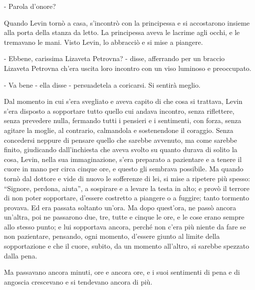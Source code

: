 - Parola d'onore? 

Quando Levin tornò a casa, s'incontrò con la principessa e si accostarono insieme alla porta della stanza da letto. La principessa aveva le lacrime agli occhi, e le tremavano le mani. Visto Levin, lo abbracciò e si mise a piangere. 

- Ebbene, carissima Lizaveta Petrovna? - disse, afferrando per un braccio Lizaveta Petrovna ch'era uscita loro incontro con un viso luminoso e preoccupato. 

- Va bene - ella disse - persuadetela a coricarsi. Si sentirà meglio. 

Dal momento in cui s'era svegliato e aveva capito di che cosa si trattava, Levin s'era disposto a sopportare tutto quello cui andava incontro, senza riflettere, senza prevedere nulla, fermando tutti i pensieri e i sentimenti, con forza, senza agitare la moglie, al contrario, calmandola e sostenendone il coraggio. Senza concedersi neppure di pensare quello che sarebbe avvenuto, ma come sarebbe finito, giudicando dall'inchiesta che aveva svolto su quanto durava di solito la cosa, Levin, nella sua immaginazione, s'era preparato a pazientare e a tenere il cuore in mano per circa cinque ore, e questo gli sembrava possibile. Ma quando tornò dal dottore e vide di nuovo le sofferenze di lei, si mise a ripetere più spesso: ``Signore, perdona, aiuta'', a sospirare e a levare la testa in alto; e provò il terrore di non poter sopportare, d'essere costretto a piangere o a fuggire; tanto tormento provava. Ed era passata soltanto un'ora. Ma dopo quest'ora, ne passò ancora un'altra, poi ne passarono due, tre, tutte e cinque le ore, e le cose erano sempre allo stesso punto; e lui sopportava ancora, perché non c'era più niente da fare se non pazientare, pensando, ogni momento, d'essere giunto al limite della sopportazione e che il cuore, subito, da un momento all'altro, si sarebbe spezzato dalla pena. 

Ma passavano ancora minuti, ore e ancora ore, e i suoi sentimenti di pena e di angoscia crescevano e si tendevano ancora di più. 

